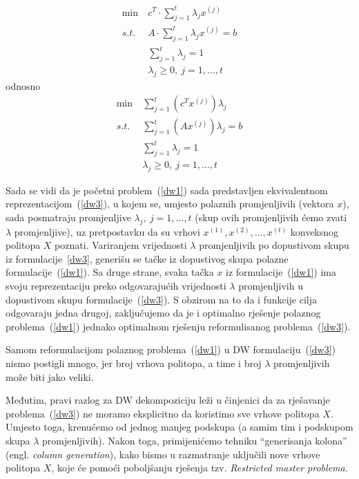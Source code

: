 \documentclass[a4paper, utf8, 11pt, colorlinks]{book}
\begin{document}
 
   \begin{equation}
 	\begin{aligned}\label{dw2}
 		\min\  &c^T\cdot \sum_{j=1}^t\lambda_jx^{(j)}\\
 		s.t.\  &A\cdot \sum_{j=1}^t\lambda_jx^{(j)}=b\\
 		 		 &\sum_{j=1}^t\lambda_j = 1\\
 		&\lambda_j\geqslant 0,\ j = 1,\ldots,t
 	\end{aligned}
 \end{equation}
odnosno
    \begin{equation}
 	\begin{aligned}\label{dw3}
 		\min\  & \sum_{j=1}^t(c^T x^{(j)})\lambda_j\\
 		s.t.\  &\sum_{j=1}^t (A x^{(j)})\lambda_j=b\\
 		&\sum_{j=1}^t\lambda_j = 1\\
 		&\lambda_j\geqslant 0,\ j = 1,\ldots,t
 	\end{aligned}
 \end{equation}
 
 Sada se vidi da je početni problem~(\ref{dw1}) sada predstavljen ekvivalentnom reprezentacijom~(\ref{dw3}), u kojem se, umjesto polaznih promjenljivih (vektora $x$), sada posmatraju promjenljive $\lambda_j,\ j = 1,\ldots,t$ (skup ovih promjenljivih ćemo zvati $\lambda$ promjenljive), uz pretpostavku da su  vrhovi $x^{(1)},x^{(2)},\dots,x^{(t)}$ konveksnog politopa $X$ poznati. Variranjem vrijednosti $\lambda$ promjenljivih po dopustivom skupu iz formulacije~\ref{dw3}, generišu se tačke iz dopustivog skupa polazne formulacije~(\ref{dw1}). Sa druge strane, svaka tačka $x$ iz formulacije~(\ref{dw1}) ima svoju reprezentaciju preko odgovarajućih vrijednosti  $\lambda$ promjenljivih u dopustivom skupu formulacije~(\ref{dw3}). S obzirom na to da i funkcije cilja odgovaraju jedna drugoj, zaključujemo da je i optimalno rješenje polaznog problema~(\ref{dw1}) jednako optimalnom rješenju reformulisanog problema~(\ref{dw3}).
 
 Samom reformulacijom polaznog problema~(\ref{dw1}) u DW formulaciju~(\ref{dw3}) nismo postigli mnogo, jer broj vrhova politopa, a time i broj $\lambda$ promjenljivih može biti jako veliki.
 
 Međutim, pravi razlog za DW dekompoziciju leži u činjenici da za rješavanje problema~(\ref{dw3}) ne moramo eksplicitno da koristimo sve vrhove politopa $X$. Umjesto toga, krenućemo od jednog   manjeg podskupa (a samim tim i podskupom skupa $\lambda$ promjenljivih). Nakon toga, primijenićemo tehniku ``generisanja kolona'' (engl. \emph{column generation}), kako bismo u razmatranje uključili nove vrhove politopa $X$, koje će pomoći poboljšanju rješenja tzv. \emph{Restricted master problema}.
 
\end{document}
